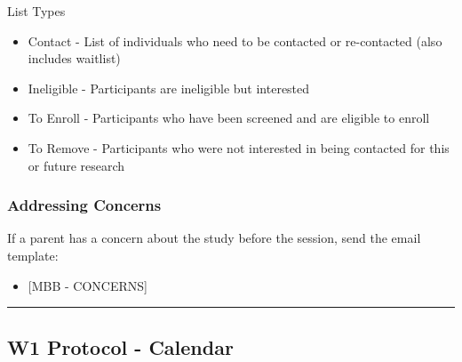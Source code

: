 \documentclass[]{book}
\providecommand{\tightlist}{%
  \setlength{\itemsep}{0pt}\setlength{\parskip}{0pt}}
\begin{document}
List Types

\begin{itemize}
\tightlist
\item
  Contact - List of individuals who need to be contacted or re-contacted (also includes waitlist)
\item
  Ineligible - Participants are ineligible but interested
\item
  To Enroll - Participants who have been screened and are eligible to enroll
\item
  To Remove - Participants who were not interested in being contacted for this or future research
\end{itemize}

\hypertarget{addressing-concerns}{%
\subsubsection{Addressing Concerns}\label{addressing-concerns}}

If a parent has a concern about the study before the session, send the email template:

\begin{itemize}
\tightlist
\item
  {[}MBB - CONCERNS{]}
\end{itemize}

\begin{center}\rule{0.5\linewidth}{0.5pt}\end{center}

\hypertarget{w1-protocol---calendar}{%
\subsection{W1 Protocol - Calendar}\label{w1-protocol---calendar}}
\end{document}
